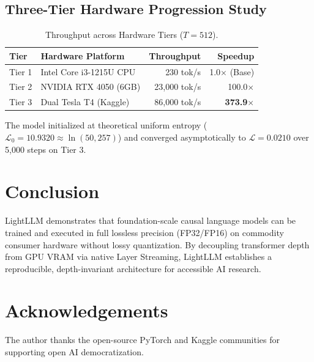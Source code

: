 \documentclass[10pt,twocolumn,a4paper]{article}
\begin{document}
\subsection{Three-Tier Hardware Progression Study}
\begin{table}[H]
\centering
\small
\caption{Throughput across Hardware Tiers ($T=512$).}
\label{tab:hardware_tiers}
\begin{tabular}{llrr}
\toprule
\textbf{Tier} & \textbf{Hardware Platform} & \textbf{Throughput} & \textbf{Speedup} \\
\midrule
Tier 1 & Intel Core i3-1215U CPU & 230 tok/s & 1.0$\times$ (Base) \\
Tier 2 & NVIDIA RTX 4050 (6GB) & 23,000 tok/s & 100.0$\times$ \\
Tier 3 & Dual Tesla T4 (Kaggle) & 86,000 tok/s & \textbf{373.9$\times$} \\
\bottomrule
\end{tabular}
\end{table}

The model initialized at theoretical uniform entropy ($\mathcal{L}_0 = 10.9320 \approx \ln(50,257)$) and converged asymptotically to $\mathcal{L} = 0.0210$ over 5,000 steps on Tier 3.

\section{Conclusion}
\label{sec:conclusion}

LightLLM demonstrates that foundation-scale causal language models can be trained and executed in full lossless precision (FP32/FP16) on commodity consumer hardware without lossy quantization. By decoupling transformer depth from GPU VRAM via native Layer Streaming, LightLLM establishes a reproducible, depth-invariant architecture for accessible AI research.

\section*{Acknowledgements}
The author thanks the open-source PyTorch and Kaggle communities for supporting open AI democratization.



\end{document}
